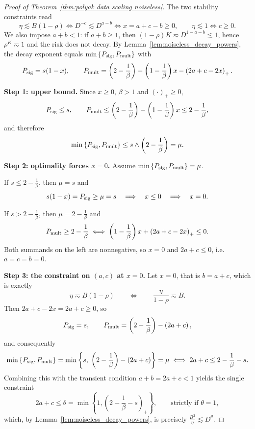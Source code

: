 \begin{proof}[Proof of Theorem~\ref{thm:polyak data scaling noiseless}]
The two stability constraints read
\[
    \eta\lesssim B(1-\rho)
    \iff
    D^{-c}\lesssim D^{a-b}
    \iff
    x=a+c-b\geq0,
    \qquad
    \eta\lesssim1
    \iff
    c\geq0 .
\]
We also impose \(a+b<1\): if \(a+b\geq1\), then \((1-\rho)K\eqsim D^{1-a-b}\lesssim1\), hence \(\rho^{K}\eqsim1\) and the risk does not decay. By Lemma~\ref{lem:noiseless_decay_powers}, the decay exponent equals \(\min\left\{P_{\rm sig},P_{\rm mult}\right\}\) with
\[
    P_{\rm sig}=s(1-x),
    \qquad
    P_{\rm mult}
    =
    \left(2-\frac1\beta\right)-\left(1-\frac1\beta\right)x-\left(2a+c-2x\right)_{+}.
\]

\textbf{Step 1: upper bound.} Since \(x\geq0\), \(\beta>1\) and \(\left(\cdot\right)_{+}\geq0\),
\[
    P_{\rm sig}\leq s,
    \qquad
    P_{\rm mult}\leq\left(2-\frac1\beta\right)-\left(1-\frac1\beta\right)x\leq2-\frac1\beta,
\]
and therefore
\[
    \min\left\{P_{\rm sig},P_{\rm mult}\right\}
    \leq
    s\wedge\left(2-\frac1\beta\right)
    =
    \mu .
\]

\textbf{Step 2: optimality forces \(x=0\).} Assume \(\min\left\{P_{\rm sig},P_{\rm mult}\right\}=\mu\).

If \(s\leq2-\frac1\beta\), then \(\mu=s\) and
\[
    s(1-x)=P_{\rm sig}\geq\mu=s
    \quad\Longrightarrow\quad
    x\leq0
    \quad\Longrightarrow\quad
    x=0 .
\]

If \(s>2-\frac1\beta\), then \(\mu=2-\frac1\beta\) and
\[
    P_{\rm mult}\geq2-\frac1\beta
    \iff
    \left(1-\frac1\beta\right)x+\left(2a+c-2x\right)_{+}\leq0 .
\]
Both summands on the left are nonnegative, so \(x=0\) and \(2a+c\leq0\), i.e. \(a=c=b=0\).

\textbf{Step 3: the constraint on \(\left(a,c\right)\) at \(x=0\).} Let \(x=0\), that is \(b=a+c\), which is exactly
\[
    \eta\eqsim B(1-\rho)
    \qquad\Longleftrightarrow\qquad
    \frac{\eta}{1-\rho}\eqsim B .
\]
Then \(2a+c-2x=2a+c\geq0\), so
\[
    P_{\rm sig}=s,
    \qquad
    P_{\rm mult}=\left(2-\frac1\beta\right)-\left(2a+c\right),
\]
and consequently
\[
    \min\left\{P_{\rm sig},P_{\rm mult}\right\}
    =
    \min\left\{s,\;\left(2-\frac1\beta\right)-\left(2a+c\right)\right\}
    =
    \mu
    \iff
    2a+c\leq2-\frac1\beta-s .
\]
Combining this with the transient condition \(a+b=2a+c<1\) yields the single constraint
\[
    2a+c\leq\theta=\min\left\{1,\left(2-\frac1\beta-s\right)_{+}\right\},
    \qquad\text{strictly if }\theta=1,
\]
which, by Lemma~\ref{lem:noiseless_decay_powers}, is precisely \(\frac{B^{2}}{\eta}\lesssim D^{\theta}\).


\end{proof}
